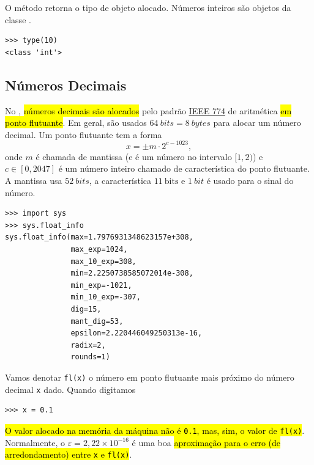 \begin{obs}
  O método {\python} {\PYTHONtype} retorna o tipo de objeto alocado. Números inteiros são objetos da classe {\PYTHONint}.

\begin{lstlisting}
>>> type(10)
<class 'int'>
\end{lstlisting}

\end{obs}

\subsection{Números Decimais}\label{cap_lingua_sec_numop:subsec:float}

No {\python}, \hl{números decimais são alocados} pelo padrão \href{https://en.wikipedia.org/wiki/IEEE\_754}{IEEE 774} de aritmética \hl{em ponto flutuante}. Em geral, são usados $64~\textit{bits} = 8~\textit{bytes}$ para alocar um número decimal. Um ponto flutuante tem a forma
\begin{equation}
  x = \pm m\cdot 2^{c-1023},
\end{equation}
onde $m$ é chamada de mantissa (e é um número no intervalo $[1,2)$) e $c\in [0, 2047]$ é um número inteiro chamado de característica do ponto flutuante. A mantissa usa $52~\textit{bits}$, a característica $11~\text{bits}$ e $1~\textit{bit}$ é usado para o sinal do número.

\begin{lstlisting}
>>> import sys
>>> sys.float_info
sys.float_info(max=1.7976931348623157e+308, 
               max_exp=1024, 
               max_10_exp=308, 
               min=2.2250738585072014e-308, 
               min_exp=-1021, 
               min_10_exp=-307, 
               dig=15, 
               mant_dig=53, 
               epsilon=2.220446049250313e-16, 
               radix=2, 
               rounds=1)
\end{lstlisting}

Vamos denotar \lstinline+fl(x)+ o número em ponto flutuante mais próximo do número decimal \lstinline+x+ dado. Quando digitamos

\begin{lstlisting}
>>> x = 0.1
\end{lstlisting}

\hl{O valor alocado na memória da máquina não é \texttt{0.1}, mas, sim, o valor de \texttt{fl(x)}}. Normalmente, o  $\varepsilon = 2,22\times 10^{-16}$ é uma boa \hl{aproximação para o erro (de arredondamento) entre \texttt{x} e \texttt{fl(x)}}.

